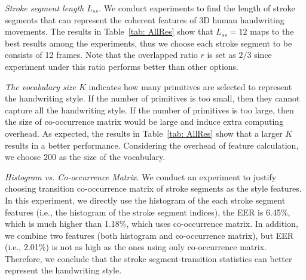  \textit{Stroke segment length $L_{ss}$.}  We conduct experiments to find the length of stroke segments that can represent the coherent features of 3D human handwriting movements. The results in Table~\ref{tab: AllRes} show that $L_{ss} = 12$ maps to the best results among the experiments, thus we choose each stroke segment to be consists of 12 frames. Note that the overlapped ratio $r$ is set as $2/3$ since experiment under this ratio performs better than other options. 

 \textit{The vocabulary size $K$} indicates how many primitives are selected to represent the handwriting style. If the number of primitives is too small, then they cannot capture all the handwriting style. If the number of primitives is too large, then the size of co-occurrence matrix would be large and induce extra computing overhead. As expected, the results in Table~\ref{tab: AllRes} show that a larger $K$ results in a better performance. Considering the overhead of feature calculation, we choose $200$ as the size of the vocabulary. 

\textit{Histogram vs. Co-occurrence Matrix.} We conduct an
experiment to justify choosing transition co-occurrence matrix
of stroke segments as the style features. In this experiment, we
directly use the histogram of the each  stroke segment
features (i.e., the histogram of the stroke segment indices), the EER is 6.45\%, which is much higher
than 1.18\%, which uses co-occurrence matrix. In addition, we combine two features (both histogram and co-occurrence matrix), but EER (i.e., 2.01\%) is not as high as the ones using only co-occurrence matrix. Therefore, we conclude that the stroke segment-transition statistics can better represent the handwriting style.









